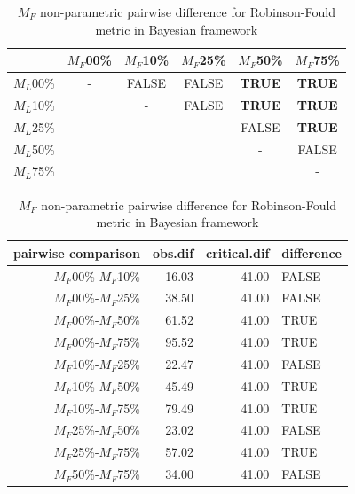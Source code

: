 \documentclass[12pt,letterpaper]{article}
\begin{document}
\begin{table}
\caption{$M_F$ non-parametric pairwise difference for Robinson-Fould metric in Bayesian framework}
\centering
\begin{tabular}{c|ccccc}
    \hline
              & $M_F$00\% & $M_F$10\% & $M_F$25\% & $M_F$50\% & $M_F$75\% \\
    \hline
    $M_L$00\% & - & FALSE & FALSE & \textbf{TRUE} & \textbf{TRUE}\\
    $M_L$10\% & & - & FALSE & \textbf{TRUE} & \textbf{TRUE} \\
    $M_L$25\% & & & - & FALSE & \textbf{TRUE} \\
    $M_L$50\% & & & & - & FALSE \\
    $M_L$75\% & & & & & - \\
    \hline
\end{tabular}
\centering
\begin{tabular}{rrrl}
 pairwise comparison & obs.dif & critical.dif & difference \\ 
  \hline
  $M_F$00\%-$M_F$10\% & 16.03 & 41.00 & FALSE \\ 
  $M_F$00\%-$M_F$25\% & 38.50 & 41.00 & FALSE \\ 
  $M_F$00\%-$M_F$50\% & 61.52 & 41.00 & TRUE \\ 
  $M_F$00\%-$M_F$75\% & 95.52 & 41.00 & TRUE \\ 
  $M_F$10\%-$M_F$25\% & 22.47 & 41.00 & FALSE \\ 
  $M_F$10\%-$M_F$50\% & 45.49 & 41.00 & TRUE \\ 
  $M_F$10\%-$M_F$75\% & 79.49 & 41.00 & TRUE \\ 
  $M_F$25\%-$M_F$50\% & 23.02 & 41.00 & FALSE \\ 
  $M_F$25\%-$M_F$75\% & 57.02 & 41.00 & TRUE \\ 
  $M_F$50\%-$M_F$75\% & 34.00 & 41.00 & FALSE \\ 
   \hline
\end{tabular}
\label{MF_results}
\end{table}
\end{document}
